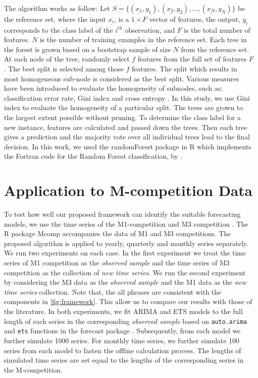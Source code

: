 \documentclass[11pt,a4paper,]{article}
\theoremstyle{definition}
\theoremstyle{definition}
\theoremstyle{definition}
\theoremstyle{remark}
\begin{document}
The algorithm works as follow: Let
\(S=\{(\underline{x_1}, y_1), (\underline{x_2}, y_2), \dots, (\underline{x_N}, y_N)\}\)
be the reference set, where the input \(\underline{x_i}\), is a
\(1\times F\) vector of features, the output, \(y_i\) corresponds to the
class label of the \(i^{th}\) observation, and \(F\) is the total number
of features. \(N\) is the number of training examples in the reference
set. Each tree in the forest is grown based on a bootstrap sample of
size \(N\) from the reference set. At each node of the tree, randomly
select \(f\) features from the full set of features \(F\). The best
split is selected among those \(f\) features. The split which results in
most homogeneous sub-node is considered as the best split. Various
measures have been introduced to evaluate the homogeneity of subnodes,
such as; classification error rate, Gini index and cross entropy
\autocite{friedman2001elements}. In this study, we use Gini index to
evaluate the homogeneity of a particular split. The trees are grown to
the largest extent possible without pruning. To determine the class
label for a new instance, features are calculated and passed down the
trees. Then each tree gives a prediction and the majority vote over all
individual trees lead to the final decision. In this work, we used the
randomForest package \autocite{liaw2002randomforest} in R which
implements the Fortran code for the Random Forest classification, by
\textcite{breiman2004random}.

\section{Application to M-competition Data}\label{Mcomp}

To test how well our proposed framework can identify the suitable
forecasting models, we use the time series of the M1-competition
\autocite{makridakis1982accuracy} and M3 competition
\autocite{makridakis2000m3}. The R package Mcomp \autocite{hyndmanmcomp}
accompanies the data of M1 and M3 competitions. The proposed algorithm
is applied to yearly, quarterly and monthly series separately. We run
two experiments on each case. In the first experiment we treat the time
series of M1 competition as the \emph{observed sample} and the time
series of M3 competition as the collection of \emph{new time series}. We
run the second experiment by considering the M3 data as the
\emph{observed sample} and the M1 data as the \emph{new time series}
collection. Note that, the all phrases are consistent with the
components in \autoref{fig:framework}. This allow us to compare our
results with those of the literature. In both experiments, we fit ARIMA
and ETS models to the full length of each series in the corresponding
\emph{observed sample} based on \texttt{auto.arima} and \texttt{ets}
functions in the forecast package \autocite{Hyndman2008}. Subsequently,
from each model we further simulate 1000 series. For monthly time
series, we further simulate 100 series from each model to fasten the
offline calculation process. The lengths of simulated time series are
set equal to the lengths of the corresponding series in the
M-competition.
\end{document}
